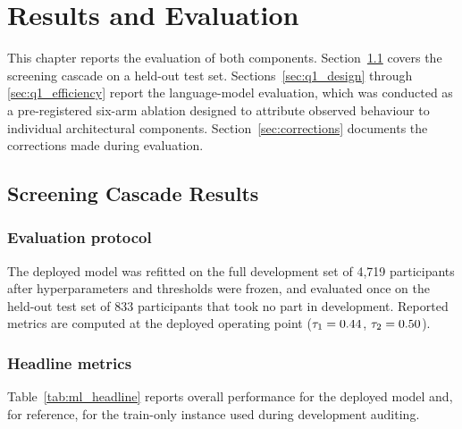 \chapter{Results and Evaluation}
\label{ch:results}

This chapter reports the evaluation of both components. Section~\ref{sec:ml_results}
covers the screening cascade on a held-out test set. Sections~\ref{sec:q1_design}
through \ref{sec:q1_efficiency} report the language-model evaluation, which was
conducted as a pre-registered six-arm ablation designed to attribute observed
behaviour to individual architectural components.
Section~\ref{sec:corrections} documents the corrections made during evaluation.

\section{Screening Cascade Results}
\label{sec:ml_results}

\subsection{Evaluation protocol}

The deployed model was refitted on the full development set of 4{,}719
participants after hyperparameters and thresholds were frozen, and evaluated
once on the held-out test set of 833 participants that took no part in
development. Reported metrics are computed at the deployed operating point
($\tau_{1} = 0.44$, $\tau_{2} = 0.50$).

\subsection{Headline metrics}

Table~\ref{tab:ml_headline} reports overall performance for the deployed model
and, for reference, for the train-only instance used during development
auditing.

